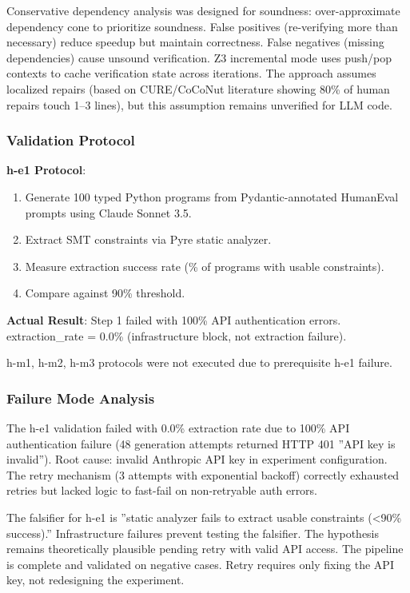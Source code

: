 Conservative dependency analysis was designed for soundness: over-approximate dependency cone to prioritize soundness. False positives (re-verifying more than necessary) reduce speedup but maintain correctness. False negatives (missing dependencies) cause unsound verification. Z3 incremental mode uses push/pop contexts to cache verification state across iterations. The approach assumes localized repairs (based on CURE/CoCoNut literature showing 80\% of human repairs touch 1--3 lines), but this assumption remains unverified for LLM code.

\subsubsection{Validation Protocol}

\textbf{h-e1 Protocol}:
\begin{enumerate}
\item Generate 100 typed Python programs from Pydantic-annotated HumanEval prompts using Claude Sonnet 3.5.
\item Extract SMT constraints via Pyre static analyzer.
\item Measure extraction success rate (\% of programs with usable constraints).
\item Compare against 90\% threshold.
\end{enumerate}

\textbf{Actual Result}: Step 1 failed with 100\% API authentication errors. extraction\_rate = 0.0\% (infrastructure block, not extraction failure).

h-m1, h-m2, h-m3 protocols were not executed due to prerequisite h-e1 failure.

\subsubsection{Failure Mode Analysis}

The h-e1 validation failed with 0.0\% extraction rate due to 100\% API authentication failure (48 generation attempts returned HTTP 401 ''API key is invalid''). Root cause: invalid Anthropic API key in experiment configuration. The retry mechanism (3 attempts with exponential backoff) correctly exhausted retries but lacked logic to fast-fail on non-retryable auth errors.

The falsifier for h-e1 is ''static analyzer fails to extract usable constraints (<90\% success).'' Infrastructure failures prevent testing the falsifier. The hypothesis remains theoretically plausible pending retry with valid API access. The pipeline is complete and validated on negative cases. Retry requires only fixing the API key, not redesigning the experiment.

